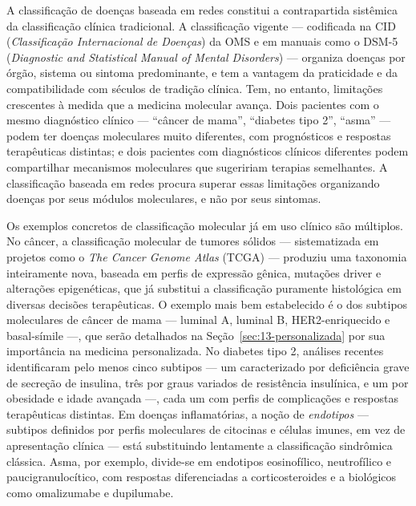 A classificação de doenças baseada em redes constitui a contrapartida sistêmica da classificação clínica tradicional. A classificação vigente --- codificada na CID (\emph{Classificação Internacional de Doenças}) da OMS e em manuais como o DSM-5 (\emph{Diagnostic and Statistical Manual of Mental Disorders}) --- organiza doenças por órgão, sistema ou sintoma predominante, e tem a vantagem da praticidade e da compatibilidade com séculos de tradição clínica. Tem, no entanto, limitações crescentes à medida que a medicina molecular avança. Dois pacientes com o mesmo diagnóstico clínico --- ``câncer de mama'', ``diabetes tipo 2'', ``asma'' --- podem ter doenças moleculares muito diferentes, com prognósticos e respostas terapêuticas distintas; e dois pacientes com diagnósticos clínicos diferentes podem compartilhar mecanismos moleculares que sugeririam terapias semelhantes. A classificação baseada em redes procura superar essas limitações organizando doenças por seus módulos moleculares, e não por seus sintomas.

Os exemplos concretos de classificação molecular já em uso clínico são múltiplos. No câncer, a classificação molecular de tumores sólidos --- sistematizada em projetos como o \emph{The Cancer Genome Atlas} (TCGA) --- produziu uma taxonomia inteiramente nova, baseada em perfis de expressão gênica, mutações driver e alterações epigenéticas, que já substitui a classificação puramente histológica em diversas decisões terapêuticas. O exemplo mais bem estabelecido é o dos subtipos moleculares de câncer de mama --- luminal A, luminal B, HER2-enriquecido e basal-símile ---, que serão detalhados na Seção~\ref{sec:13-personalizada} por sua importância na medicina personalizada. No diabetes tipo 2, análises recentes identificaram pelo menos cinco subtipos --- um caracterizado por deficiência grave de secreção de insulina, três por graus variados de resistência insulínica, e um por obesidade e idade avançada ---, cada um com perfis de complicações e respostas terapêuticas distintas. Em doenças inflamatórias, a noção de \emph{endotipos} --- subtipos definidos por perfis moleculares de citocinas e células imunes, em vez de apresentação clínica --- está substituindo lentamente a classificação sindrômica clássica. Asma, por exemplo, divide-se em endotipos eosinofílico, neutrofílico e paucigranulocítico, com respostas diferenciadas a corticosteroides e a biológicos como omalizumabe e dupilumabe.

